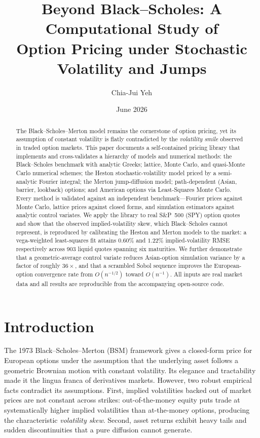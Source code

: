 \documentclass[11pt]{article}
\title{\textbf{Beyond Black--Scholes: A Computational Study of\\
Option Pricing under Stochastic Volatility and Jumps}}
\author{Chia-Jui Yeh}
\affil{\small Companion paper to the \texttt{options-pricing-engine} repository}
\date{June 2026}
\begin{document}
\maketitle

\begin{abstract}
\noindent
The Black--Scholes--Merton model remains the cornerstone of option pricing, yet
its assumption of constant volatility is flatly contradicted by the
\emph{volatility smile} observed in traded option markets. This paper documents a
self-contained pricing library that implements and cross-validates a hierarchy of
models and numerical methods: the Black--Scholes benchmark with analytic Greeks;
lattice, Monte Carlo, and quasi-Monte Carlo numerical schemes; the Heston
stochastic-volatility model priced by a semi-analytic Fourier integral; the
Merton jump-diffusion model; path-dependent (Asian, barrier, lookback) options;
and American options via Least-Squares Monte Carlo. Every method is validated
against an independent benchmark---Fourier prices against Monte Carlo, lattice
prices against closed forms, and simulation estimators against analytic control
variates. We apply the library to real S\&P~500 (SPY) option quotes and show that
the observed implied-volatility skew, which Black--Scholes cannot represent, is
reproduced by calibrating the Heston and Merton models to the market: a
vega-weighted least-squares fit attains $0.60\%$ and $1.22\%$ implied-volatility
RMSE respectively across 903 liquid quotes spanning six maturities. We further
demonstrate that a geometric-average control variate reduces Asian-option
simulation variance by a factor of roughly $36\times$, and that a scrambled Sobol
sequence improves the European-option convergence rate from $O(n^{-1/2})$ toward
$O(n^{-1})$. All inputs are real market data and all results are reproducible from
the accompanying open-source code.
\end{abstract}

\section{Introduction}

The 1973 Black--Scholes--Merton (BSM) framework \citep{blackscholes1973,
merton1973} gives a closed-form price for European options under the assumption
that the underlying asset follows a geometric Brownian motion with constant
volatility. Its elegance and tractability made it the lingua franca of
derivatives markets. However, two robust empirical facts contradict its
assumptions. First, implied volatilities backed out of market prices are not
constant across strikes: out-of-the-money equity puts trade at systematically
higher implied volatilities than at-the-money options, producing the
characteristic \emph{volatility skew}. Second, asset returns exhibit heavy tails
and sudden discontinuities that a pure diffusion cannot generate.
\end{document}
